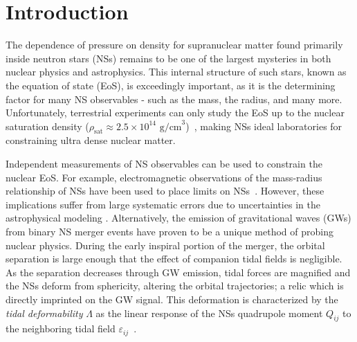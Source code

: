 \documentclass[prd,twocolumn,nofootinbib,superscriptaddress,amsmath,amssymb]{revtex4-1}
\begin{document}
\maketitle


\section{Introduction}\label{sec:intro}
The dependence of pressure on density for  supranuclear matter found primarily inside neutron stars (NSs) remains to be one of the largest mysteries in both nuclear physics and astrophysics.
This internal structure of such stars, known as the equation of state (EoS), is exceedingly important, as it is the determining factor for many NS observables - such as the mass, the radius, and many more.
Unfortunately, terrestrial experiments can only study the EoS up to the nuclear saturation density ($\rho_{\text{sat}} \approx 2.5 \times 10^{14} \text{ g/cm}^3$)~\cite{Li:HeavyIon,Tsang:SymmetryEnergy,Centelles:NeutronSkin,Li:CrossSections,Chen:SymEnergy}, making NSs ideal laboratories for constraining ultra dense nuclear matter.

Independent measurements of NS observables can be used to constrain the nuclear EoS.
For example, electromagnetic observations of the mass-radius relationship of NSs have been used to place limits on NSs~\cite{guver,ozel-baym-guver,steiner-lattimer-brown,Lattimer2014,Ozel:2016oaf}.
However, these implications  suffer from large systematic errors due to uncertainties in the astrophysical modeling .
Alternatively, the emission of gravitational waves (GWs) from binary NS merger events have proven to be a unique method of probing nuclear physics.
During the early inspiral portion of the merger, the orbital separation is large enough that the effect of companion tidal fields is negligible. 
As the separation decreases through GW emission, tidal forces are magnified and the NSs deform from sphericity, altering the orbital trajectories; a relic which is directly imprinted on the GW signal.
This deformation is characterized by the \textit{tidal deformability} $\Lambda$ as the linear response of the NSs quadrupole moment $Q_{ij}$ to the neighboring tidal field $\varepsilon_{ij}$~\cite{hinderer-love,Flanagan2008}.
\end{document}
